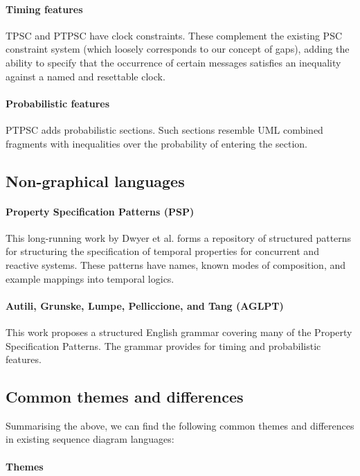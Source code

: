 \paragraph{Timing features}
TPSC and PTPSC have clock constraints.  These complement the existing PSC constraint system
(which loosely corresponds to our concept of gaps), adding the ability to
specify that the occurrence of certain messages satisfies an inequality against
a named and resettable clock.

\paragraph{Probabilistic features}
PTPSC adds probabilistic
sections.  Such sections resemble UML combined fragments with inequalities over
the probability of entering the section.

\subsection{Non-graphical languages}

\paragraph{Property Specification Patterns (PSP)}

This long-running work by Dwyer et al. forms a repository of
structured patterns for structuring the specification of temporal
properties for concurrent and reactive systems.  These patterns have names,
known modes of composition, and example mappings into temporal logics.

\paragraph{Autili, Grunske, Lumpe, Pelliccione, and Tang (AGLPT)}

This work proposes a structured English grammar covering many of the Property
Specification Patterns.  The grammar provides for timing and probabilistic
features.

\subsection{Common themes and differences}

Summarising the above, we can find the following common
themes and differences in existing sequence
diagram languages:

\paragraph{Themes}

